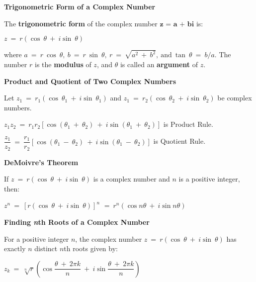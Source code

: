 \documentclass{article}
\begin{document}
\begin{large}
\textbf{Trigonometric Form of a Complex Number}

\hspace{0.1in} The \textbf{trigonometric form} of the complex number $\textbf{z\ =\ a\ +\ bi}$ is:

\hspace{2.0in} $z\ =\ r(\cos \ \theta\ +\ i\sin \ \theta)$

\hspace{0.1in} where $a\ =\ r\ \cos \ \theta,\ b\ =\ r\ \sin \ \theta,\ r\ =\ \sqrt{a^{2}\ +\ b^{2}},\ \text{and}\ \tan \ \theta\ =\ b/a$.  The number $r$ is the \textbf{modulus} of $z$, and $\theta$ is called an \textbf{argument} of $z$.

\vspace{0.5in}
\textbf{Product and Quotient of Two Complex Numbers}

\hspace{0.1in} Let $z_{1}\ =\ r_{1}(\cos \ \theta_{1}\ +\ i\sin \ \theta_{1})$ and $z_{1}\ =\ r_{2}(\cos \ \theta_{2}\ +\ i\sin \ \theta_{2})$ be complex numbers.

\hspace{1.0in} $z_{1}z_{2}\ =\ r_{1}r_{2}\left[ \cos (\theta_{1}\ +\ \theta_{2})\ +\ i\sin (\theta_{1}\ +\ \theta_{2})\right]$ is Product Rule.

\hspace{1.0in} $\dfrac{z_{1}}{z_{2}}\ =\ \dfrac{r_{1}}{r_{2}}\left[ \cos (\theta_{1}\ -\ \theta_{2})\ +\ i\sin (\theta_{1}\ -\ \theta_{2})\right]$ is Quotient Rule.

\textbf{DeMoivre's Theorem}

\hspace{0.1in} If $z\ =\ r(\cos \ \theta\ +\ i\sin \ \theta)$ is a complex number and $n$ is a positive integer, then:

\hspace{1.3in} $z^{n}\ =\ \left[ r(\cos \ \theta\ +\ i\sin \ \theta)\right]^{n}$ $=\ r^{n}(\cos n\theta\ +\ i\sin n\theta)$

\textbf{Finding \textit{n}th Roots of a Complex Number}

\hspace{0.1in} For a positive integer $n$, the complex number $z\ =\ r(\cos \ \theta\ +\ i\sin \ \theta)$ has exactly $n$ distinct $n$th roots given by:

\hspace{1.5in} $z_{k}\ =\ \sqrt[n]{r}\left(\cos \dfrac{\theta\ +\ 2\pi k}{n}\ +\ i\sin \dfrac{\theta\ +\ 2\pi k}{n}\right)$


\end{large}
\end{document}
